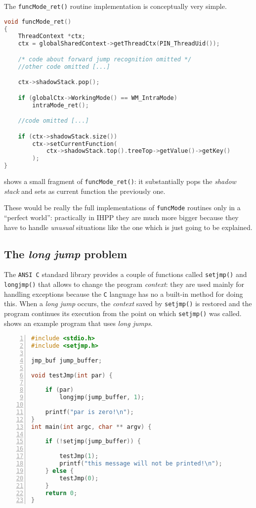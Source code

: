 \documentclass[a4paper,10pt]{report}
\begin{document}
The \verb|funcMode_ret()| routine implementation is conceptually very simple.

\begin{lstlisting}[language=C++,
	caption={a fragment of \texttt{funcMode\_ret()} routine},
	label=funcret, frame=leftline]
void funcMode_ret()
{
	ThreadContext *ctx;
	ctx = globalSharedContext->getThreadCtx(PIN_ThreadUid());

	/* code about forward jump recognition omitted */
	//other code omitted [...]

	ctx->shadowStack.pop();

	if (globalCtx->WorkingMode() == WM_IntraMode)
		intraMode_ret();

	//code omitted [...]

	if (ctx->shadowStack.size())
		ctx->setCurrentFunction(
			ctx->shadowStack.top().treeTop->getValue()->getKey()
		);
}
\end{lstlisting}

\noindent
{} shows a small fragment of \verb|funcMode_ret()|:
it substantially pops the \emph{shadow stack} and sets as current function
the previously one.

These would be really the full implementations of \verb|funcMode| routines
only in a ``perfect world'': practically in IHPP they are much more bigger
because they have to handle \emph{unusual} situations like the one
which is just going to be explained.

\subsection{The \emph{long jump} problem}

The \verb|ANSI C| standard library provides a couple of functions called
\verb|setjmp()| and \verb|longjmp()| that allows to change the program \emph{context}:
they are used mainly for handling exceptions because the \verb|C| language
has no a built-in method for doing this.
When a \emph{long jump} occurs, the \emph{context} saved by \verb|setjmp()| is restored
and the program continues its execution from the point on which \verb|setjmp()| was called.
 shows an example program that uses \emph{long jumps}.

\begin{lstlisting}[language=C++,
	caption={source code of \texttt{prog7.c}},
	label=longjmp1, frame=leftline, numbers=left, showstringspaces=false]
#include <stdio.h>
#include <setjmp.h>

jmp_buf jump_buffer;

void testJmp(int par) {

	if (par)
		longjmp(jump_buffer, 1);

	printf("par is zero!\n");
}
int main(int argc, char ** argv) {

	if (!setjmp(jump_buffer)) {

		testJmp(1);
		printf("this message will not be printed!\n");
	} else {
		testJmp(0);
	}
	return 0;
}
\end{lstlisting}
\end{document}
